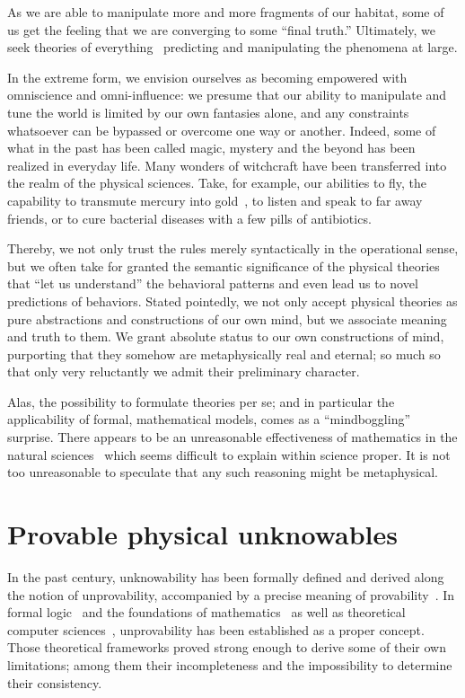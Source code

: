 \documentclass[rmp,amsfonts,showpacs,showkeys,twocolumn]{revtex4}
\begin{document}
As we are able to manipulate more and more fragments
of our habitat, some of us get the feeling that we are converging to some ``final truth.''
Ultimately, we seek theories of everything~\cite{barrow-TOE}
predicting and manipulating the phenomena at large.

In the extreme form, we envision ourselves as becoming empowered with omniscience and omni-influence:
we presume that our ability to manipulate and tune the world is limited by our own fantasies alone,
and any constraints whatsoever can be bypassed or overcome one way or another.
Indeed, some of what in the past has been called magic, mystery and the beyond has been realized in everyday life.
Many wonders of witchcraft have been transferred into the realm of the physical sciences.
Take, for example, our abilities to fly,
the capability to transmute mercury into gold~\cite{PhysRev.60.473},
to listen and speak to far away friends,
or to cure bacterial diseases with a few pills of antibiotics.

Thereby, we not only trust the rules merely syntactically in the operational sense,
but we often take for granted the semantic significance of the physical theories that ``let us understand'' the
behavioral patterns and even lead us to novel predictions of behaviors.
Stated pointedly, we not only accept physical theories as pure abstractions and constructions of our own mind,
but we associate meaning and truth to them.
We grant absolute status to our own constructions of mind,
purporting that they somehow are metaphysically real and eternal;
so much so that only very reluctantly we admit their preliminary character.

Alas, the possibility to formulate theories per se;
and in particular the applicability of formal, mathematical models, comes as a ``mindboggling'' surprise.
There appears to be an unreasonable effectiveness of mathematics in the natural sciences~\cite{wigner}
which seems difficult to explain within science proper.
It is not too unreasonable to speculate that any such reasoning might be metaphysical.



\section{Provable physical unknowables}

In the past century, unknowability has been formally defined and derived along the notion of unprovability,
accompanied by a precise meaning of provability~\cite{rogers1,odi:89,odi:99}.
In formal logic~\cite{godel1} and the foundations of mathematics~\cite{tarski:32,tarski:56}
as well as theoretical computer sciences~\cite{turing-36,chaitin3},
unprovability has been established as a proper concept.
Those theoretical frameworks proved strong enough to derive some of their own limitations;
among them their incompleteness and the impossibility to determine their consistency.
\end{document}
